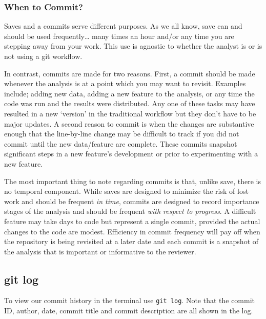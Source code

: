 \documentclass[
  letterpaper,
  DIV=11,
  numbers=noendperiod]{scrreprt}
\begin{document}
\hypertarget{when-to-commit}{%
\subsubsection{When to Commit?}\label{when-to-commit}}

Saves and a commits serve different purposes. As we all know, save can
and should be used frequently\ldots{} many times an hour and/or any time
you are stepping away from your work. This use is agnostic to whether
the analyst is or is not using a git workflow.

In contrast, commits are made for two reasons. First, a commit should be
made whenever the analysis is at a point which you may want to revisit.
Examples include; adding new data, adding a new feature to the analysis,
or any time the code was run and the results were distributed. Any one
of these tasks may have resulted in a new `version' in the traditional
workflow but they don't have to be major updates. A second reason to
commit is when the changes are substantive enough that the line-by-line
change may be difficult to track if you did not commit until the new
data/feature are complete. These commits snapshot significant steps in a
new feature's development or prior to experimenting with a new feature.

The most important thing to note regarding commits is that, unlike save,
there is no temporal component. While saves are designed to minimize the
risk of lost work and should be frequent \emph{in time}, commits are
designed to record importance stages of the analysis and should be
frequent \emph{with respect to progress}. A difficult feature may take
days to code but represent a single commit, provided the actual changes
to the code are modest. Efficiency in commit frequency will pay off when
the repository is being revisited at a later date and each commit is a
snapshot of the analysis that is important or informative to the
reviewer.

\hypertarget{git-log}{%
\subsection{git log}\label{git-log}}

To view our commit history in the terminal use \texttt{git\ log}. Note
that the commit ID, author, date, commit title and commit description
are all shown in the log.
\end{document}
